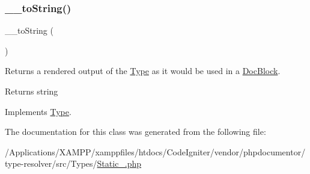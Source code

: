 \subsubsection{\texorpdfstring{\+\_\+\+\_\+to\+String()}{\_\_toString()}}
{\footnotesize\ttfamily \+\_\+\+\_\+to\+String (\begin{DoxyParamCaption}{ }\end{DoxyParamCaption})}

Returns a rendered output of the \mbox{\hyperlink{interfacephp_documentor_1_1_reflection_1_1_type}{Type}} as it would be used in a \mbox{\hyperlink{classphp_documentor_1_1_reflection_1_1_doc_block}{Doc\+Block}}.

\begin{DoxyReturn}{Returns}
string 
\end{DoxyReturn}


Implements \mbox{\hyperlink{interfacephp_documentor_1_1_reflection_1_1_type_a7516ca30af0db3cdbf9a7739b48ce91d}{Type}}.



The documentation for this class was generated from the following file\+:\begin{DoxyCompactItemize}
\item 
/\+Applications/\+X\+A\+M\+P\+P/xamppfiles/htdocs/\+Code\+Igniter/vendor/phpdocumentor/type-\/resolver/src/\+Types/\mbox{\hyperlink{_static___8php}{Static\+\_\+.\+php}}\end{DoxyCompactItemize}
